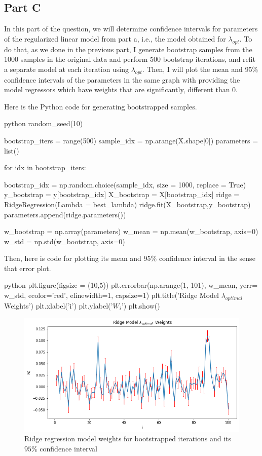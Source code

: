 \documentclass[12pt]{amsart}
\begin{document}
\subsection{Part C}
In this part of the question, we will determine confidence intervals for parameters of the regularized linear model from part a, i.e., the model obtained for $\lambda_{opt}$. To do that, as we done in the previous part, I generate bootstrap samples from the 1000 samples in the original data and perform 500 bootstrap iterations, and refit a separate model at each iteration using $\lambda_{opt}$. Then, I will plot the mean and 95\% confidence intervals of the parameters in the same graph with providing the model regressors which have weights that are significantly, different than 0.


\bigskip
Here is the Python code for generating bootstrapped samples.

\begin{mintedbox}{python}
random_seed(10)

bootstrap_iters = range(500)
sample_idx = np.arange(X.shape[0])
parameters = list()

for idx in bootstrap_iters:

    bootstrap_idx = np.random.choice(sample_idx, size = 1000, replace = True)
    y_bootstrap = y[bootstrap_idx]
    X_bootstrap = X[bootstrap_idx]
    ridge = RidgeRegression(Lambda = best_lambda)
    ridge.fit(X_bootstrap,y_bootstrap)
    parameters.append(ridge.parameters()) 
    
w_bootstrap = np.array(parameters)
w_mean = np.mean(w_bootstrap, axis=0)
w_std = np.std(w_bootstrap, axis=0)
\end{mintedbox}


Then, here is code for plotting its mean and $95\%$ confidence interval in the sense that error plot.
\begin{mintedbox}{python}
plt.figure(figsize = (10,5))
plt.errorbar(np.arange(1, 101),
             w_mean,
             yerr= w_std,
             ecolor='red',
             elinewidth=1,
             capsize=1)
plt.title('Ridge Model $\lambda_{optimal}$  Weights')
plt.xlabel('i')
plt.ylabel('$W_i$')
plt.show()
\end{mintedbox}

\begin{figure}[h]
    \centering
    \includegraphics[width = 1\textwidth]{images/4.png}
    \caption{Ridge regression model weights for bootstrapped iterations and its $95\%$ confidence interval}
\end{figure}
\end{document}

